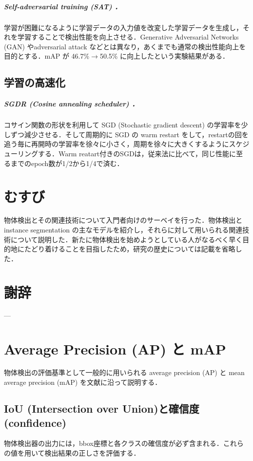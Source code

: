 \documentclass[twocolumn]{jsarticle} %
\begin{document}
\subparagraph{Self-adversarial training (SAT) \cite{BWL20}．} \label{sec:SAT} 学習が困難になるように学習データの入力値を改変した学習データを生成し，それを学習することで検出性能を向上させる．Generative Adversarial Networks (GAN) やadversarial attack などとは異なり，あくまでも通常の検出性能向上を目的とする．mAP が 46.7\%{$\rightarrow$}50.5\% に向上したという実験結果がある．

\subsection{学習の高速化}
\subparagraph{SGDR (Cosine annealing scheduler) \cite{LoshHut17}．} \label{sec:cos} コサイン関数の形状を利用して SGD (Stochastic gradient descent) の学習率を少しずつ減少させる．そして周期的に SGD の warm restart をして，restartの回を追う毎に再開時の学習率を徐々に小さく，周期を徐々に大きくするようにスケジューリングする．Warm reatart付きのSGDは，従来法に比べて，同じ性能に至るまでのepoch数が1/2から1/4で済む．

\section{むすび}
物体検出とその関連技術について入門者向けのサーベイを行った．物体検出と instance segmentation の主なモデルを紹介し，それらに対して用いられる関連技術について説明した．新たに物体検出を始めようとしている人がなるべく早く目的地にたどり着けることを目指したため，研究の歴史については記載を省略した．

\section*{謝辞}
---

\footnotesize

%


\appendix

\section{Average Precision (AP) と mAP}
物体検出の評価基準として一般的に用いられる average precision (AP) と mean average precision (mAP) を文献\cite{PNS20}に沿って説明する．

\subsection{IoU (Intersection over Union)と確信度(confidence)}
物体検出器の出力には，bbox座標と各クラスの確信度が必ず含まれる．これらの値を用いて検出結果の正しさを評価する．
\end{document}
